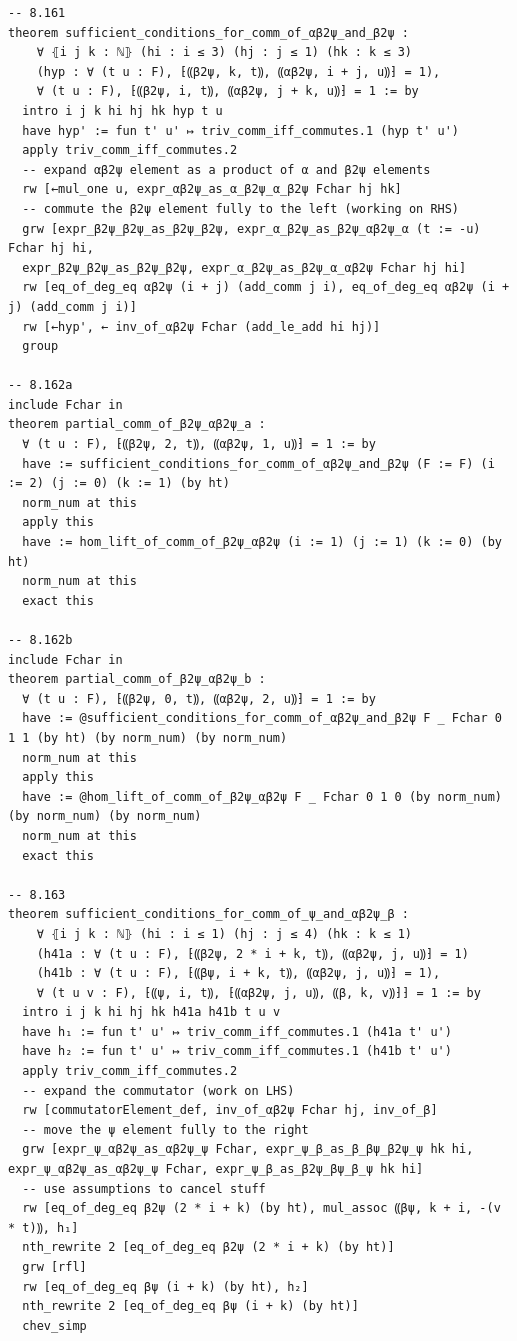 \documentclass[10pt,a4paper]{article}
\begin{document}
\begin{Verbatim}
-- 8.161
theorem sufficient_conditions_for_comm_of_αβ2ψ_and_β2ψ :
    ∀ ⦃i j k : ℕ⦄ (hi : i ≤ 3) (hj : j ≤ 1) (hk : k ≤ 3)
    (hyp : ∀ (t u : F), ⁅⸨β2ψ, k, t⸩, ⸨αβ2ψ, i + j, u⸩⁆ = 1),
    ∀ (t u : F), ⁅⸨β2ψ, i, t⸩, ⸨αβ2ψ, j + k, u⸩⁆ = 1 := by
  intro i j k hi hj hk hyp t u
  have hyp' := fun t' u' ↦ triv_comm_iff_commutes.1 (hyp t' u')
  apply triv_comm_iff_commutes.2
  -- expand αβ2ψ element as a product of α and β2ψ elements
  rw [←mul_one u, expr_αβ2ψ_as_α_β2ψ_α_β2ψ Fchar hj hk]
  -- commute the β2ψ element fully to the left (working on RHS)
  grw [expr_β2ψ_β2ψ_as_β2ψ_β2ψ, expr_α_β2ψ_as_β2ψ_αβ2ψ_α (t := -u) Fchar hj hi,
  expr_β2ψ_β2ψ_as_β2ψ_β2ψ, expr_α_β2ψ_as_β2ψ_α_αβ2ψ Fchar hj hi]
  rw [eq_of_deg_eq αβ2ψ (i + j) (add_comm j i), eq_of_deg_eq αβ2ψ (i + j) (add_comm j i)]
  rw [←hyp', ← inv_of_αβ2ψ Fchar (add_le_add hi hj)]
  group

-- 8.162a
include Fchar in
theorem partial_comm_of_β2ψ_αβ2ψ_a :
  ∀ (t u : F), ⁅⸨β2ψ, 2, t⸩, ⸨αβ2ψ, 1, u⸩⁆ = 1 := by
  have := sufficient_conditions_for_comm_of_αβ2ψ_and_β2ψ (F := F) (i := 2) (j := 0) (k := 1) (by ht)
  norm_num at this
  apply this
  have := hom_lift_of_comm_of_β2ψ_αβ2ψ (i := 1) (j := 1) (k := 0) (by ht)
  norm_num at this
  exact this

-- 8.162b
include Fchar in
theorem partial_comm_of_β2ψ_αβ2ψ_b :
  ∀ (t u : F), ⁅⸨β2ψ, 0, t⸩, ⸨αβ2ψ, 2, u⸩⁆ = 1 := by
  have := @sufficient_conditions_for_comm_of_αβ2ψ_and_β2ψ F _ Fchar 0 1 1 (by ht) (by norm_num) (by norm_num)
  norm_num at this
  apply this
  have := @hom_lift_of_comm_of_β2ψ_αβ2ψ F _ Fchar 0 1 0 (by norm_num) (by norm_num) (by norm_num)
  norm_num at this
  exact this

-- 8.163
theorem sufficient_conditions_for_comm_of_ψ_and_αβ2ψ_β :
    ∀ ⦃i j k : ℕ⦄ (hi : i ≤ 1) (hj : j ≤ 4) (hk : k ≤ 1)
    (h41a : ∀ (t u : F), ⁅⸨β2ψ, 2 * i + k, t⸩, ⸨αβ2ψ, j, u⸩⁆ = 1)
    (h41b : ∀ (t u : F), ⁅⸨βψ, i + k, t⸩, ⸨αβ2ψ, j, u⸩⁆ = 1),
    ∀ (t u v : F), ⁅⸨ψ, i, t⸩, ⁅⸨αβ2ψ, j, u⸩, ⸨β, k, v⸩⁆⁆ = 1 := by
  intro i j k hi hj hk h41a h41b t u v
  have h₁ := fun t' u' ↦ triv_comm_iff_commutes.1 (h41a t' u')
  have h₂ := fun t' u' ↦ triv_comm_iff_commutes.1 (h41b t' u')
  apply triv_comm_iff_commutes.2
  -- expand the commutator (work on LHS)
  rw [commutatorElement_def, inv_of_αβ2ψ Fchar hj, inv_of_β]
  -- move the ψ element fully to the right
  grw [expr_ψ_αβ2ψ_as_αβ2ψ_ψ Fchar, expr_ψ_β_as_β_βψ_β2ψ_ψ hk hi, expr_ψ_αβ2ψ_as_αβ2ψ_ψ Fchar, expr_ψ_β_as_β2ψ_βψ_β_ψ hk hi]
  -- use assumptions to cancel stuff
  rw [eq_of_deg_eq β2ψ (2 * i + k) (by ht), mul_assoc ⸨βψ, k + i, -(v * t)⸩, h₁]
  nth_rewrite 2 [eq_of_deg_eq β2ψ (2 * i + k) (by ht)]
  grw [rfl]
  rw [eq_of_deg_eq βψ (i + k) (by ht), h₂]
  nth_rewrite 2 [eq_of_deg_eq βψ (i + k) (by ht)]
  chev_simp


\end{Verbatim}
\end{document}
